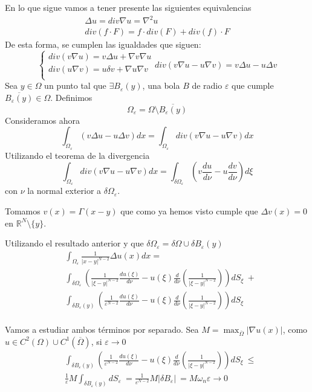 En lo que sigue vamos a tener presente las siguientes equivalencias
\begin{equation*}
\begin{array}{l}
\Delta u = div \nabla u = \nabla^2 u\\
div(f\cdot F) = f\cdot div(F)+div(f)\cdot F
\end{array}
\end{equation*}
De esta forma, se cumplen las igualdades que siguen:
\begin{equation*}
\left\{
\begin{array}{l}
div(v\nabla u)=v\Delta u+\nabla v\nabla u\\
div(u\nabla v)=u\delta v+\nabla u\nabla v\\
\end{array}
\right.
div(v\nabla u-u\nabla v) = v\Delta u-u\Delta v
\end{equation*}
Sea $y\in \Omega$ un punto tal que $\exists B_\varepsilon(y)$, una bola $B$ de radio $\varepsilon$ que cumple $\overline{B_\varepsilon(y)}\in\Omega$. Definimos
$$\Omega_\varepsilon = \Omega\setminus \overline{B_\varepsilon(y)}$$
Consideramos ahora 
$$\int_{\Omega_\varepsilon} \left(v\Delta u-u\Delta v\right)dx =\int_{\Omega_\varepsilon} div\left(v\nabla u-u\nabla v\right)dx $$
Utilizando el teorema de la divergencia
$$\int_{\Omega_\varepsilon} div\left(v\nabla u-u\nabla v\right)dx =\int_{\delta\Omega_\varepsilon} \left(v\frac{du}{d\nu}-u\frac{dv}{d\nu}\right)d\xi$$
con $\nu$ la normal exterior a $\delta\Omega_\varepsilon$.

Tomamos $v(x) = \Gamma(x-y)$ que como ya hemos visto cumple que $\Delta v(x) = 0$ en $\mathbb{R}^N\setminus\{y\}$.

Utilizando el resultado anterior y que $\delta \Omega_\varepsilon = \delta\Omega \cup \delta B_\varepsilon(y)$ 
\begin{align*}
& \int_{\Omega_\varepsilon} \frac{1}{|x-y|^{N-2}}\Delta u(x)dx =\\
& \int_{\delta\Omega_\varepsilon} \left(\frac{1}{|\xi-y|^{N-2}}\frac{du(\xi)}{d\nu}-u(\xi)\frac{d}{d\nu}\left(\frac{1}{|\xi-y|^{N-2}}\right)\right)dS_\xi \ + \\
& \int_{\delta B_\varepsilon(y)} \left(\frac{1}{\varepsilon^{N-2}}\frac{du(\xi)}{d\nu}-u(\xi)\frac{d}{d\nu}\left(\frac{1}{|\xi-y|^{N-2}}\right)\right)dS_\xi\\
\end{align*}

Vamos a estudiar ambos términos por separado. Sea $M=\max_{\overline{\Omega}}|\nabla u(x)|$, como $u\in C^2(\Omega)\cup C^1(\overline{\Omega})$, si $\varepsilon\to 0$
\begin{align*}
& \int_{\delta B_\varepsilon(y)} \left(\frac{1}{\varepsilon^{N-2}}\frac{du(\xi)}{d\nu}-u(\xi)\frac{d}{d\nu}\left(\frac{1}{|\xi-y|^{N-2}}\right)\right)dS_\xi \ \le\\
& \frac{1}{\varepsilon}M\int_{\delta B_\varepsilon(y)} dS_\varepsilon \ = \frac{1}{\varepsilon^{N-2}}M|\delta B_\varepsilon| \ = M\omega_n\varepsilon\to 0\\
\end{align*}

